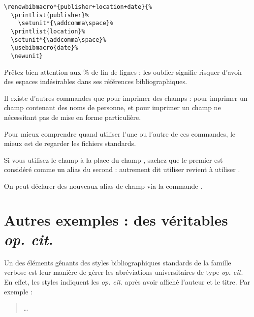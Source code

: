 \begin{verbatim}
\renewbibmacro*{publisher+location+date}{%
  \printlist{publisher}%
    \setunit*{\addcomma\space}%
  \printlist{location}%
  \setunit*{\addcomma\space}%
  \usebibmacro{date}%
  \newunit}
\end{verbatim}





Prêtez bien attention aux \% de fin de lignes : les oublier signifie risquer d'avoir des espaces indésirables dans ses références bibliographiques.


\begin{plusloins}

Il  existe d'autres commandes que  pour imprimer des champs :  pour imprimer un champ contenant des noms de personne, et  pour imprimer un champ ne nécessitant pas de mise en forme particulière.

Pour mieux comprendre quand utiliser l'une ou l'autre de ces commandes, le mieux est de regarder les fichiers standards.

\end{plusloins}
\begin{plusloins}
Si vous utilisez le champ  à la place du champ , sachez que le premier est considéré comme un alias du second : autrement dit utiliser  revient à utiliser .

On peut déclarer des nouveaux alias de champ via la commande .
\end{plusloins}

\section{Autres exemples : des véritables \emph{op. cit.}}

Un des éléments gênants des styles bibliographiques standards de la famille verbose est leur manière de gérer les abréviations universitaires de type \emph{op. cit.} En effet, les styles indiquent les \emph{op. cit.} après avoir affiché l'auteur et le titre. Par exemple :

\begin{quotation}
\cite{Saxer1980}

…

\cite{Saxer1980}
\end{quotation}

